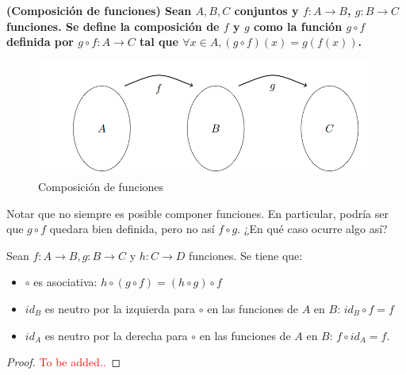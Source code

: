\begin{definicion}
	\textbf{(Composición de funciones) Sean $A,B,C$ conjuntos y $f: A\rightarrow B$, $g: B\rightarrow C$ funciones. Se define la \textbf{composición} de $f$ y $g$ como la función $g \circ f$ definida por $g \circ f : A \rightarrow C$ tal que $ \forall x \in A, (g \circ f)(x) = g(f(x))$. 
	}
\end{definicion}

\begin{figure}[H]
	\begin{center}
		\includegraphics[scale=0.5]{figuras/capitulo1/03-funciones/composicion.png}
		\caption{Composición de funciones}
	\end{center}
\end{figure}

\begin{nota} 
	Notar que no siempre es posible componer funciones. En particular, podría ser que $g \circ f$ quedara bien definida, pero no así $f \circ g$. ¿En qué caso ocurre algo así? 
\end{nota}

\begin{proposicion}
	Sean $f: A \longrightarrow B, g: B \longrightarrow C$ y $h : C \longrightarrow D$ funciones. Se tiene que: 
	\begin{itemize}
		\item $\circ$ es asociativa: $h \circ ( g \circ f) = ( h \circ g ) \circ f $
		\item $id_B$ es neutro por la izquierda para $\circ$ en las funciones de $A$ en $B$: $id_B \circ f = f$ 
		\item $id_A$ es neutro por la derecha para $\circ$ en las funciones de $A$ en $B$: $f \circ id_A = f$. 
	\end{itemize}
\end{proposicion}

\begin{proof}
	\textcolor{red}{To be added..}
\end{proof}

